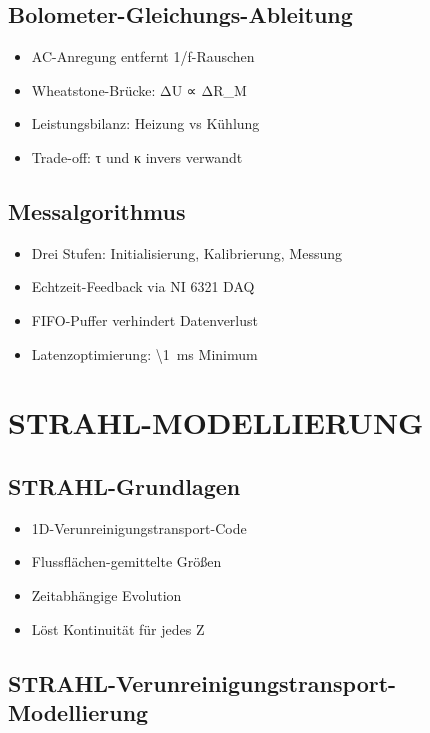 \documentclass[11pt,a4paper]{article}
\begin{document}
\subsection{Bolometer-Gleichungs-Ableitung}

\begin{itemize}
\item AC-Anregung entfernt 1/f-Rauschen
\item Wheatstone-Brücke: ΔU ∝ ΔR_M
\item Leistungsbilanz: Heizung vs Kühlung
\item Trade-off: τ und κ invers verwandt
\end{itemize}

\subsection{Messalgorithmus}

\begin{itemize}
\item Drei Stufen: Initialisierung, Kalibrierung, Messung
\item Echtzeit-Feedback via NI 6321 DAQ
\item FIFO-Puffer verhindert Datenverlust
\item Latenzoptimierung: \SI{\1}{m}s Minimum
\end{itemize}

\section{STRAHL-MODELLIERUNG}

\subsection{STRAHL-Grundlagen}

\begin{itemize}
\item 1D-Verunreinigungstransport-Code
\item Flussflächen-gemittelte Größen
\item Zeitabhängige Evolution
\item Löst Kontinuität für jedes Z
\end{itemize}

\subsection{STRAHL-Verunreinigungstransport-Modellierung}
\end{document}
